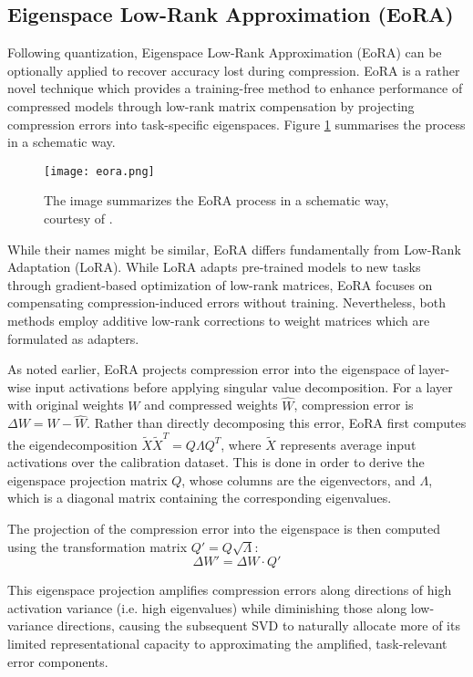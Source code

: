 \subsection{Eigenspace Low-Rank Approximation (EoRA)} \label{eora}

Following quantization, Eigenspace Low-Rank Approximation (EoRA) \cite{eora} can be optionally applied to recover accuracy lost during compression. EoRA is a rather novel technique which provides a training-free method to enhance performance of compressed models through low-rank matrix compensation by projecting compression errors into task-specific eigenspaces. Figure \ref{fig:eora} summarises the process in a schematic way.


\begin{figure}[htbp]
    \centering
    \texttt{[image: eora.png]}
    \caption[EoRA Overview]{The image summarizes the EoRA process in a schematic way, courtesy of \cite{eora}.}
    \label{fig:eora}
\end{figure}


While their names might be similar, EoRA differs fundamentally from Low-Rank Adaptation (LoRA). While LoRA adapts pre-trained models to new tasks through gradient-based optimization of low-rank matrices, EoRA focuses on compensating compression-induced errors without training. Nevertheless, both methods employ additive low-rank corrections to weight matrices which are formulated as adapters.

As noted earlier, EoRA projects compression error into the eigenspace of layer-wise input activations before applying singular value decomposition. For a layer with original weights $W$ and compressed weights $\hat{W}$, compression error is $\Delta W = W - \hat{W}$. Rather than directly decomposing this error, EoRA first computes the eigendecomposition $\tilde{X}\tilde{X}^T = Q\Lambda Q^T$, where $\tilde{X}$ represents average input activations over the calibration dataset. This is done in order to derive the eigenspace projection matrix $Q$, whose columns are the eigenvectors, and $\Lambda$, which is a diagonal matrix containing the corresponding eigenvalues.

The projection of the compression error into the eigenspace is then computed using the transformation matrix $Q' = Q\sqrt{\Lambda}$:
\begin{equation}
\Delta W' = \Delta W \cdot Q'
\end{equation}

This eigenspace projection amplifies compression errors along directions of high activation variance (i.e. high eigenvalues) while diminishing those along low-variance directions, causing the subsequent SVD to naturally allocate more of its limited representational capacity to approximating the amplified, task-relevant error components.

